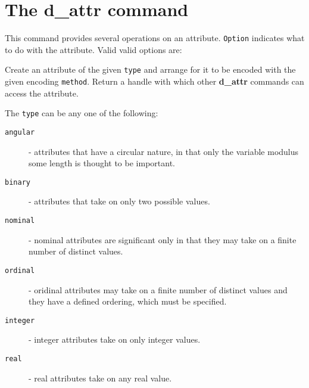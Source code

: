 \documentclass{article}
\newcommand{\dattr}{\textbf{d\_attr}}
\begin{document}
\section{The \dattr{} command}
This command provides several operations on an attribute.
\texttt{Option} indicates what to do with the attribute. Valid valid
options are:
\begin{options}
\item[d\_attr create \textsl{type method ?arg ...?}]
Create an attribute of the given \texttt{type} and arrange for it to be
encoded with the given encoding \texttt{method}.  Return a handle with
which other \dattr{} commands can access the attribute.

The \texttt{type} can be any one of the following:
\begin{description}
\item[\texttt{angular}] - attributes that have a circular nature, in that
	only the variable modulus some length is thought to be
	important.
\item[\texttt{binary}] - attributes that take on only two possible
	values.
\item[\texttt{nominal}] - nominal attributes are significant only in
    	that they may take on a finite number of distinct values.
\item[\texttt{ordinal}] - oridinal attributes may take on a finite
	number of distinct values and they have a defined ordering,
	which must be specified.
\item[\texttt{integer}] - integer attributes take on only integer values.
\item[\texttt{real}] - real attributes take on any real value.
\end{description}


\end{options}
\end{document}
